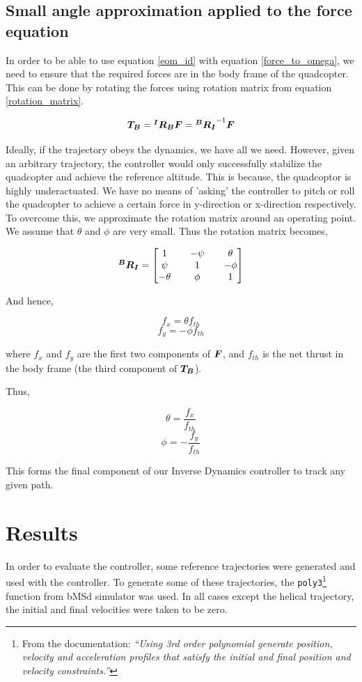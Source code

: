 \documentclass[12pt,fleqn]{article}
\newcommand{\mbm}[1]{\mbox{\boldmath $#1$}}
\begin{document}
\subsection{Small angle approximation applied to the force equation}

In order to be able to use equation \ref{eom_id} with equation
\ref{force_to_omega}, we need to ensure that the required forces are
in the body frame of the quadcopter. This can be done by rotating the
forces using rotation matrix from equation
\ref{rotation_matrix}. 

$$ \mbm{T_B} = \mbm{^IR_B} \mbm{F} = \mbm{^BR_I}^{-1} \mbm{F} $$

Ideally, if the trajectory obeys the dynamics, we have all we
need. However, given an arbitrary trajectory, the controller would
only successfully stabilize the quadcopter and achieve the reference
altitude. This is because, the quadcoptor is highly underactuated. We
have no means of 'asking' the controller to pitch or roll the quadcopter to
achieve a certain force in y-direction or x-direction
respectively.\\

To overcome this, we approximate the rotation matrix
around an operating point. We assume that $\theta$ and
$\phi$ are very small. Thus the rotation matrix becomes,

$$  \mbm{^BR_I} = \begin{bmatrix} 1 && -\psi && \theta \\ \psi && 1 && -\phi \\
  -\theta && \phi && 1 \end{bmatrix} $$

And hence, 

$$ f_x  = \theta f_{th} $$
$$ f_y = -\phi f_{th} $$

where $f_x$ and $f_y$ are the first two components of $\mbm{F}$, and
$f_{th}$ is the net thrust in the body frame (the third component of
$\mbm{T_B}$).

Thus, 

$$ \theta = \frac{f_x}{f_{th}} $$
$$ \phi = -\frac{f_y}{f_{th}} $$

This forms the final component of our Inverse Dynamics controller to
track any given path.

\section{Results}

In order to evaluate the controller, some reference trajectories were
generated and used with the controller. To generate some of these
trajectories, the \texttt{poly3}\footnote{From the documentation:
\textit{``Using 3rd order polynomial generate position, velocity and
acceleration profiles that satisfy the initial and final position and
velocity constraints.''}} function from bMSd simulator
\cite{courseWeb} was used. In all cases except the helical trajectory, the initial and final
velocities were taken to be zero. \\
\end{document}
